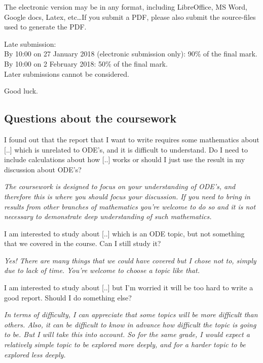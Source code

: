 The electronic version may be in any format, including LibreOffice, MS Word, Google docs, Latex, etc\ldots If you submit a PDF, please also submit the source-files used to generate the PDF.

Late submission:\\
By 10:00 on 27 January 2018 (electronic submission only): 90\% of the final mark.\\
By 10:00 on 2 February 2018: 50\% of the final mark.\\
Later submissions cannot be considered.

Good luck.

\subsection{Questions about the coursework}

I found out that the report that I want to write requires some mathematics about [..] which is unrelated to ODE's, and it is difficult to understand. Do I need to include calculations about how [..] works or should I just use the result in my discussion about ODE's?

\emph{The coursework is designed to focus on your understanding of ODE's, and therefore this is where you should focus your discussion. If you need to bring in results from other branches of mathematics you're welcome to do so and it is not necessary to demonstrate deep understanding of such mathematics.}

I am interested to study about [..] which is an ODE topic, but not something that we covered in the course. Can I still study it?

\emph{Yes! There are many things that we could have covered but I chose not to, simply due to lack of time. You're welcome to choose a topic like that.}

I am interested to study about [..] but I'm worried it will be too hard to write a good report. Should I do something else?

\emph{In terms of difficulty, I can appreciate that some topics will be more difficult than others. Also, it can be difficult to know in advance how difficult the topic is going to be. But I will take this into account. So for the same grade, I would expect a relatively simple topic to be explored more deeply, and for a harder topic to be explored less deeply.}

